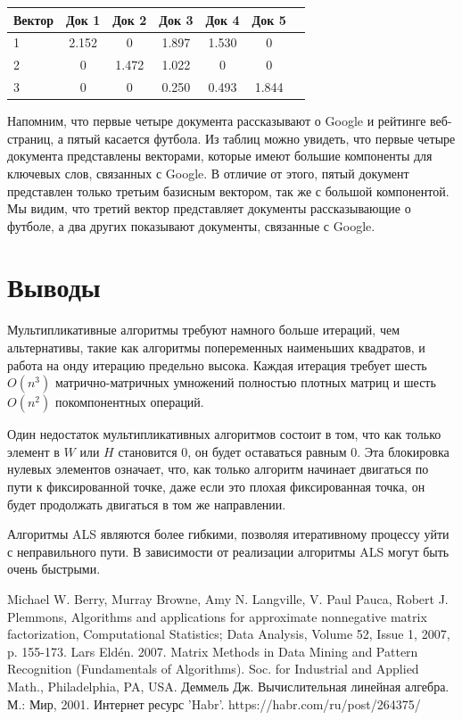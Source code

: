 \documentclass[14pt]{extarticle}
\begin{document}
\begin{center}
 \begin{tabular}{ l | c c c c c c } 
 Вектор      & Док 1 & Док 2 & Док 3 & Док 4 & Док 5 \\
 \hline
 1           & 2.152  &   0  &   1.897  &   1.530  &  0 \\ 
 2           & 0  &   1.472  &   1.022  &   0  &   0 \\
 3           & 0  &   0  &   0.250  &   0.493  &   1.844 \\ 
\end{tabular}
\end{center}


Напомним, что первые четыре документа рассказывают о Google и рейтинге веб-страниц, а пятый касается футбола. Из таблиц можно увидеть, что первые четыре документа представлены векторами, которые имеют большие компоненты для ключевых слов, связанных с Google. В отличие от этого, пятый документ представлен только третьим базисным вектором, так же с большой компонентой. Мы видим, что третий вектор представляет документы рассказывающие о футболе, а два других показывают документы, связанные с Google.


\newpage


\section{Выводы}

Мультипликативные алгоритмы требуют намного больше итераций, чем альтернативы, такие как алгоритмы попеременных наименьших квадратов, и работа на онду итерацию предельно высока. Каждая итерация требует шесть $O(n^3)$ матрично-матричных умножений полностью плотных матриц и шесть
$O (n^2)$ покомпонентных операций.

Один недостаток мультипликативных алгоритмов состоит в том, что как только элемент в $W$ или $H$ становится 0, он будет оставаться равным 0. Эта блокировка нулевых элементов означает, что, как только алгоритм начинает двигаться по пути к фиксированной точке, даже если это плохая фиксированная точка, он будет продолжать двигаться в том же направлении. 

Алгоритмы ALS являются более гибкими, позволяя итеративному процессу уйти с неправильного пути. В зависимости от реализации алгоритмы ALS могут быть очень быстрыми.


\newpage


\begin{thebibliography}{9}
	 Michael W. Berry, Murray Browne, Amy N. Langville, V. Paul Pauca, Robert
J. Plemmons, Algorithms and applications for approximate nonnegative matrix factorization, Computational Statistics; Data Analysis, Volume 52, Issue 1, 2007,
p. 155-173.
	 Lars Eldén. 2007. Matrix Methods in Data Mining and Pattern Recognition
(Fundamentals of Algorithms). Soc. for Industrial and Applied Math.,
Philadelphia, PA, USA.
	 Деммель Дж. Вычислительная линейная алгебра. М.: Мир, 2001.
	 Интернет ресурс 'Habr'. https://habr.com/ru/post/264375/
\end{thebibliography}
\end{document}
